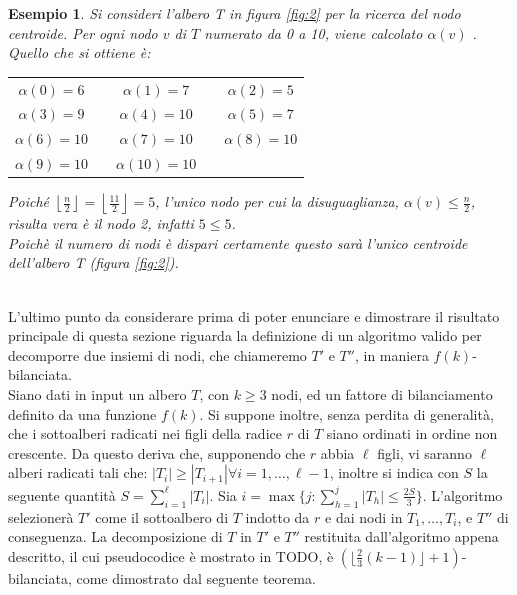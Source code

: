 \newtheorem{esempio}[definizione]{Esempio}
\begin{esempio}
	\label{es1}
Si consideri l'albero T in figura \ref{fig:2} per la ricerca del nodo centroide.
Per ogni nodo $ v $ di $ T $ numerato da 0 a 10,  viene calcolato $\alpha(v)$ . \\
Quello che si ottiene \`e: %
\begin{center}
	\centering
	\begin{tabular}{ c c c c c  }
		$\alpha(0) = 6$ & & $\alpha(1) = 7$ & & $\alpha(2) = 5$ \\ 
		$\alpha(3) = 9$ && $\alpha(4) = 10$ &&  $\alpha(5) =  7$ \\  
		$\alpha(6) = 10$ && $\alpha(7) = 10$ && $\alpha(8) = 10$ \\
		$\alpha(9) = 10$ && $\alpha(10) = 10$ &&
	\end{tabular}
\end{center}

Poich\'e $ \left\lfloor\frac{n}{2} \right\rfloor = \left\lfloor \frac{11}{2} \right\rfloor = 5$, l'unico nodo per cui la disuguaglianza, $\alpha(v)\le\frac{n}{2}$, risulta vera \`e il nodo 2, infatti $5\le 5$.\\
Poich\`e il numero di nodi \`e dispari certamente questo sar\`a l'unico centroide dell'albero T (figura \ref{fig:2}). 
\demo
\end{esempio}\mbox{}\\

L'ultimo punto da considerare prima di poter enunciare e dimostrare il risultato principale di questa sezione riguarda la definizione di un algoritmo valido per decomporre due insiemi di nodi, %
che chiameremo $ T' $ e $ T'' $, in maniera $ f(k) $-bilanciata.\\
Siano dati in input un albero $ T $, con $ k\ge 3 $ nodi, ed un fattore di bilanciamento definito da una funzione $ f(k) $. %
Si suppone inoltre, senza perdita di generalit\`a, che i sottoalberi radicati nei figli della radice $ r $ di $ T $ siano ordinati in ordine non crescente.
Da questo deriva che, supponendo che $ r $ abbia $ \ell $ figli, vi saranno $ \ell $ alberi radicati tali che: $ |T_{i}|\ge |T_{i+1}|  \forall {i = 1,\dots, \ell-1} $, inoltre si indica con $ S $ la seguente quantit\`a $ S=\sum_{i=1}^{\ell}|T_i| $.
Sia $i = \max \{ j : \sum_{h=1}^{j} |T_h| \le \frac{2 S}{3} \}$. L'algoritmo selezionerà $T'$ come il sottoalbero di $T$ indotto da $r$ e dai nodi in $T_1, \dots, T_i$, e $T''$ di conseguenza.
La decomposizione di $T$ in $T'$ e $T''$ restituita dall'algoritmo appena descritto, il cui pseudocodice è mostrato in TODO, è $ (\lfloor \frac{2}{3}(k-1) \rfloor + 1)$-bilanciata, come dimostrato dal seguente teorema.

